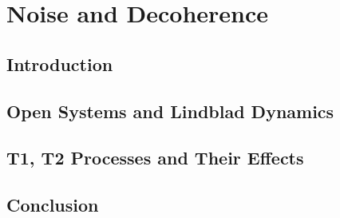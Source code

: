 \chapter{Noise and Decoherence}
\section{Introduction}
\section{Open Systems and Lindblad Dynamics}
\section{T1, T2 Processes and Their Effects}
\section{Conclusion}
